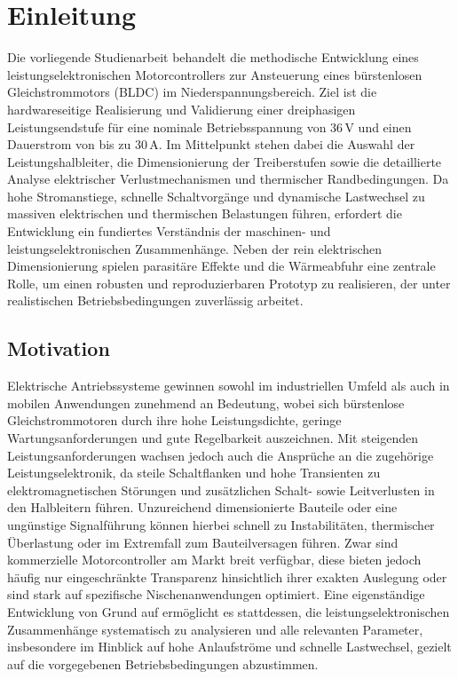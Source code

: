 \chapter{Einleitung}
\label{chap:einleitung}

Die vorliegende Studienarbeit behandelt die methodische Entwicklung eines leistungselektronischen Motorcontrollers zur Ansteuerung eines bürstenlosen Gleichstrommotors (BLDC) im Niederspannungsbereich. Ziel ist die hardwareseitige Realisierung und Validierung einer dreiphasigen Leistungsendstufe für eine nominale Betriebsspannung von $36\,\mathrm{V}$ und einen Dauerstrom von bis zu $30\,\mathrm{A}$. Im Mittelpunkt stehen dabei die Auswahl der Leistungshalbleiter, die Dimensionierung der Treiberstufen sowie die detaillierte Analyse elektrischer Verlustmechanismen und thermischer Randbedingungen. Da hohe Stromanstiege, schnelle Schaltvorgänge und dynamische Lastwechsel zu massiven elektrischen und thermischen Belastungen führen, erfordert die Entwicklung ein fundiertes Verständnis der maschinen- und leistungselektronischen Zusammenhänge. Neben der rein elektrischen Dimensionierung spielen parasitäre Effekte und die Wärmeabfuhr eine zentrale Rolle, um einen robusten und reproduzierbaren Prototyp zu realisieren, der unter realistischen Betriebsbedingungen zuverlässig arbeitet.

\section{Motivation}

Elektrische Antriebssysteme gewinnen sowohl im industriellen Umfeld als auch in mobilen Anwendungen zunehmend an Bedeutung, wobei sich bürstenlose Gleichstrommotoren durch ihre hohe Leistungsdichte, geringe Wartungsanforderungen und gute Regelbarkeit auszeichnen. Mit steigenden Leistungsanforderungen wachsen jedoch auch die Ansprüche an die zugehörige Leistungselektronik, da steile Schaltflanken und hohe Transienten zu elektromagnetischen Störungen und zusätzlichen Schalt- sowie Leitverlusten in den Halbleitern führen. Unzureichend dimensionierte Bauteile oder eine ungünstige Signalführung können hierbei schnell zu Instabilitäten, thermischer Überlastung oder im Extremfall zum Bauteilversagen führen. Zwar sind kommerzielle Motorcontroller am Markt breit verfügbar, diese bieten jedoch häufig nur eingeschränkte Transparenz hinsichtlich ihrer exakten Auslegung oder sind stark auf spezifische Nischenanwendungen optimiert. Eine eigenständige Entwicklung von Grund auf ermöglicht es stattdessen, die leistungselektronischen Zusammenhänge systematisch zu analysieren und alle relevanten Parameter, insbesondere im Hinblick auf hohe Anlaufströme und schnelle Lastwechsel, gezielt auf die vorgegebenen Betriebsbedingungen abzustimmen.

